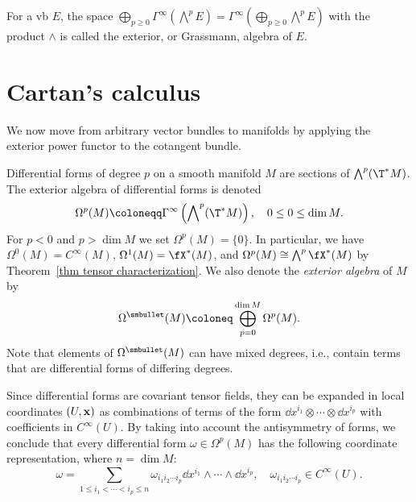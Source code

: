 \begin{defn}
For a \gls{vb} $E$, the space $\bigoplus_{p\geq 0}\Gamma^\infty(\bigwedge\nolimits^p E)=\Gamma^\infty\left(\bigoplus_{p\geq 0}\bigwedge\nolimits^p E\right)$ with the product $\wedge$ is called the exterior, or Grassmann, algebra of $E$.
\end{defn}







\section{Cartan's calculus}

We now move from arbitrary vector bundles to manifolds by applying the exterior power functor to the cotangent bundle.

\begin{defn}
    Differential forms of degree $p$ on a smooth manifold $M$ are sections of $\bigwedge\nolimits^p (\T^\ast M)$. The exterior algebra of differential forms is denoted
    \[\Omega^p(M)\coloneqq \Gamma^\infty\left(\bigwedge\nolimits^p(\T^\ast M)\right),\quad 0\leq 0\leq\dim M.\]
    For $p<0$ and $p>\dim M$ we set $\Omega^p(M)=\{0\}$.
    In particular, we have $\Omega^0(M)=C^\infty(M)$, $\Omega^1(M)=\fX^\ast (M)$, and $\Omega^p(M)\cong \bigwedge\nolimits^p \fX^\ast(M)$ by Theorem~\ref{thm tensor characterization}. We also denote the \emph{exterior algebra} of $M$ by
    \[\Omega^{\smbullet}(M)\coloneq\bigoplus_{p=0}^{\dim M} \Omega^p(M).\]
    Note that elements of $\Omega^{\smbullet}(M)$ can have mixed degrees, i.e., contain terms that are differential forms of differing degrees.
\end{defn}


\begin{rem}
    Since differential forms are covariant tensor fields, they can be expanded in local coordinates $(U,\bf{x})$ as combinations of terms of the form $\dd x^{i_1}\otimes\cdots\otimes \dd x^{i_p}$ with coefficients in $C^\infty(U)$. By taking into account the antisymmetry of forms, we conclude that every differential form $\omega\in\Omega^p(M)$ has the following coordinate representation, where $n=\dim M$:
    \[\omega=\sum_{1\leq i_1<\cdots <i_p\leq n}\omega_{i_1 i_2\cdots i_p}\dd x^{i_1}\wedge\cdots\wedge \dd x^{i_p},\quad \omega_{i_1 i_2\cdots i_p}\in C^\infty(U).\label{eq local rep of a p-form}\]
\end{rem}


